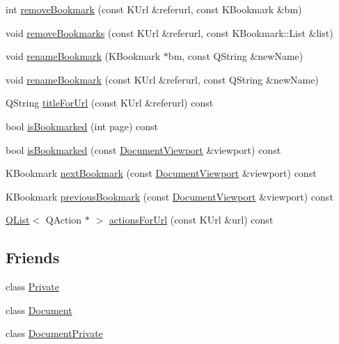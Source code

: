 \begin{DoxyCompactItemize}
\item 
int \hyperlink{classOkular_1_1BookmarkManager_a62520293e8c99ae68058fe4d00eb0e6b}{remove\+Bookmark} (const K\+Url \&referurl, const K\+Bookmark \&bm)
\item 
void \hyperlink{classOkular_1_1BookmarkManager_a3279284b0618f5bb49dba8647b6980a4}{remove\+Bookmarks} (const K\+Url \&referurl, const K\+Bookmark\+::\+List \&list)
\item 
void \hyperlink{classOkular_1_1BookmarkManager_a0e57d5f1d5795042686118ac779d85c5}{rename\+Bookmark} (K\+Bookmark $\ast$bm, const Q\+String \&new\+Name)
\item 
void \hyperlink{classOkular_1_1BookmarkManager_a99979fe5e87cb15173ac20feb7de352e}{rename\+Bookmark} (const K\+Url \&referurl, const Q\+String \&new\+Name)
\item 
Q\+String \hyperlink{classOkular_1_1BookmarkManager_a9b24aecf34aaac007418797bee80f717}{title\+For\+Url} (const K\+Url \&referurl) const 
\item 
bool \hyperlink{classOkular_1_1BookmarkManager_a606808f318c721de3e0d4954e7f84a35}{is\+Bookmarked} (int page) const 
\item 
bool \hyperlink{classOkular_1_1BookmarkManager_a531ad8e8944468b90d363e628c21c9bd}{is\+Bookmarked} (const \hyperlink{classOkular_1_1DocumentViewport}{Document\+Viewport} \&viewport) const 
\item 
K\+Bookmark \hyperlink{classOkular_1_1BookmarkManager_a0a4f8e3402938f11fc77cf6790b2562b}{next\+Bookmark} (const \hyperlink{classOkular_1_1DocumentViewport}{Document\+Viewport} \&viewport) const 
\item 
K\+Bookmark \hyperlink{classOkular_1_1BookmarkManager_a282c97d867d3f2f9c8d94b8b320ebbfa}{previous\+Bookmark} (const \hyperlink{classOkular_1_1DocumentViewport}{Document\+Viewport} \&viewport) const 
\item 
\hyperlink{classQList}{Q\+List}$<$ Q\+Action $\ast$ $>$ \hyperlink{classOkular_1_1BookmarkManager_a4fd29f115e61767e9790f3fd5ab3f11f}{actions\+For\+Url} (const K\+Url \&url) const 
\end{DoxyCompactItemize}
\subsection*{Friends}
\begin{DoxyCompactItemize}
\item 
class \hyperlink{classOkular_1_1BookmarkManager_ac96b60d37bd806132da680e187dc2288}{Private}
\item 
class \hyperlink{classOkular_1_1BookmarkManager_a883538034e58fc5c0de7d4e4cab3cef7}{Document}
\item 
class \hyperlink{classOkular_1_1BookmarkManager_ad60d3d11afe13773e689a27dbaba5d11}{Document\+Private}
\end{DoxyCompactItemize}


